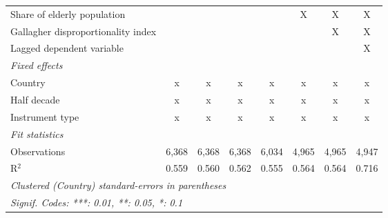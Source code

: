 \begin{tabular}{lccccccc}
   Share of elderly population                                                                 &         &         &         &         & X              & X              & X\\  
   Gallagher disproportionality index                                                          &         &         &         &         &                & X              & X\\  
   Lagged dependent variable                                                                   &         &         &         &         &                &                & X\\  
   \emph{Fixed effects}\\
   Country                                                                                     & x       & x       & x       & x       & x              & x              & x\\  
   Half decade                                                                                 & x       & x       & x       & x       & x              & x              & x\\  
   Instrument type                                                                             & x       & x       & x       & x       & x              & x              & x\\  
   \midrule \emph{Fit statistics}\\
   Observations                                                                                & 6,368   & 6,368   & 6,368   & 6,034   & 4,965          & 4,965          & 4,947\\  
   R$^2$                                                                                       & 0.559   & 0.560   & 0.562   & 0.555   & 0.564          & 0.564          & 0.716\\  
   \midrule
   \multicolumn{8}{l}{\emph{Clustered (Country) standard-errors in parentheses}}\\
   \multicolumn{8}{l}{\emph{Signif. Codes: ***: 0.01, **: 0.05, *: 0.1}}\\
\end{tabular}
\par\endgroup


